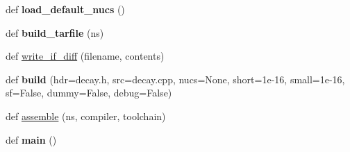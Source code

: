 \begin{DoxyCompactItemize}
\mbox{\label{namespacedecaygen_ab917878a5a2030610eb4efc30d2a208b}} 
def {\bfseries load\+\_\+default\+\_\+nucs} ()
\item 
\mbox{\label{namespacedecaygen_a186ffe371e635d38926a89173138104c}} 
def {\bfseries build\+\_\+tarfile} (ns)
\item 
def \hyperlink{namespacedecaygen_ac625462eeb48e9518c0eb2af888b4fe2}{write\+\_\+if\+\_\+diff} (filename, contents)
\item 
\mbox{\label{namespacedecaygen_a41a23a18bcee73e00f19efe1dd4dd3eb}} 
def {\bfseries build} (hdr=\textquotesingle{}decay.\+h\textquotesingle{}, src=\textquotesingle{}decay.\+cpp\textquotesingle{}, nucs=None, short=1e-\/16, small=1e-\/16, sf=\+False, dummy=\+False, debug=\+False)
\item 
def \hyperlink{namespacedecaygen_ae1a55c211308fb0ada306dd453b9d5f1}{assemble} (ns, compiler, toolchain)
\item 
\mbox{\label{namespacedecaygen_a7df76be2c39839304c2ed0e37e95cc30}} 
def {\bfseries main} ()
\end{DoxyCompactItemize}
